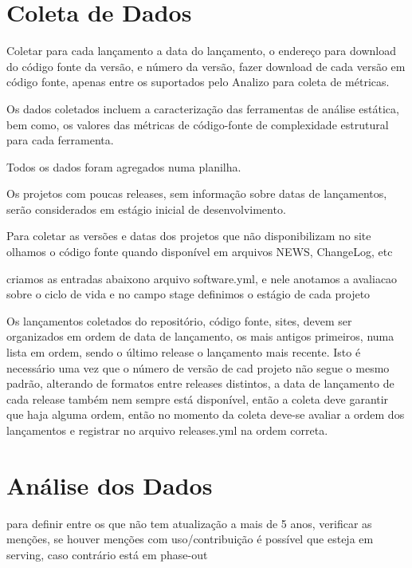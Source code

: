 \section{Coleta de Dados} \label{estudo3:coleta}

Coletar para cada lançamento a data do lançamento, o endereço para download
do código fonte da versão, e número da versão, fazer download de cada versão
em código fonte, apenas entre os suportados pelo Analizo para coleta de métricas.

Os dados coletados incluem a caracterização das ferramentas de análise
estática, bem como, os valores das métricas de código-fonte de complexidade
estrutural para cada ferramenta.

Todos os dados foram agregados numa planilha.

Os projetos com poucas releases, sem informação sobre datas de lançamentos, serão
considerados em estágio inicial de desenvolvimento.

Para coletar as versões e datas dos projetos que não disponibilizam no site olhamos
o código fonte quando disponível em arquivos NEWS, ChangeLog, etc

criamos as entradas abaixono arquivo software.yml, e nele anotamos
a avaliacao sobre o ciclo de vida e no campo stage definimos o estágio
de cada projeto




Os lançamentos coletados do repositório, código fonte, sites, devem ser organizados
em ordem de data de lançamento, os mais antigos primeiros, numa lista em ordem, sendo
o último release o lançamento mais recente. Isto é necessário uma vez que o número de versão
de cad projeto não segue o mesmo padrão, alterando de formatos entre releases distintos,
a data de lançamento de cada release também nem sempre está disponível, então
a coleta deve garantir que haja alguma ordem, então no momento da coleta deve-se
avaliar a ordem dos lançamentos e registrar no arquivo releases.yml na ordem correta.

\section{Análise dos Dados} \label{estudo3:analise}

para definir entre os que não tem atualização a mais de 5 anos, verificar as
menções, se houver menções com uso/contribuição é possível que esteja em serving,
caso contrário está em phase-out

